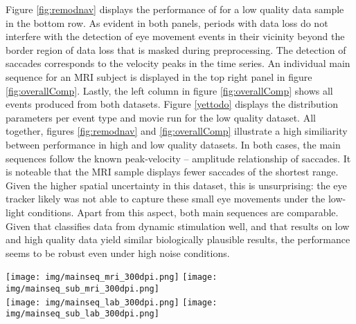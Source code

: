
Figure \ref{fig:remodnav} displays the performance of \remodnav for a low
quality data sample in the bottom row.  As evident in both panels, periods with
data loss do not interfere with the detection of eye movement events in their
vicinity beyond the border region of data loss that is masked during
preprocessing. The detection of saccades corresponds to the velocity peaks in
the time series. An individual main sequence for an MRI subject is displayed
in the top right panel in figure \ref{fig:overallComp}. Lastly, the left column in figure
\ref{fig:overallComp} shows all events produced from both datasets. Figure \ref{yettodo}
displays the distribution parameters per event type and movie run for the low
quality dataset. 
All together, figures \ref{fig:remodnav} and
\ref{fig:overallComp} illustrate a high similiarity between performance in high
and low quality datasets. In both cases, the main sequences follow the known
peak-velocity -- amplitude relationship of saccades. It is noteable that the
MRI sample displays fewer saccades of the shortest range. Given the higher
spatial uncertainty in this dataset, this is unsurprising: the eye tracker
likely was not able to capture these small eye movements under the low-light
conditions. Apart from this aspect, both main sequences are comparable. Given
that \remodnav classifies data from dynamic stimulation well, and that results
on low and high quality data yield similar biologically plausible results, the
performance seems to be robust even under high noise conditions.

\begin{figure*}[tbp]
  \texttt{[image: img/mainseq\_mri\_300dpi.png]}
  \texttt{[image: img/mainseq\_sub\_mri\_300dpi.png]} \\
  \texttt{[image: img/mainseq\_lab\_300dpi.png]}
  \texttt{[image: img/mainseq\_sub\_lab\_300dpi.png]} \\

  \caption{Main sequence of eye movement events during one 15 minute sequence of
  the movie (segment 2) for MRI (top), and lab participants (bottom). Data
  across all participants is shown in the right, and data for a single
  exemplary participant on the left.}

  \label{fig:overallComp}
\end{figure*}


